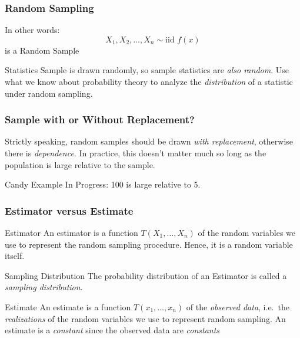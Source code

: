 \documentclass[handout]{beamer}
\begin{document}
\begin{frame}
\frametitle{Random Sampling}
In other words:
	$$X_1, X_2, \hdots, X_n \sim \mbox{iid } f(x)$$
is a \alert{Random Sample}

	\vspace{1em}
\begin{block}{Statistics}
Sample is drawn randomly, so sample statistics are \emph{also random}. Use what we know about probability theory to analyze the \emph{distribution} of a statistic under random sampling.
\end{block}
\end{frame}

\begin{frame}
\frametitle{Sample with or Without Replacement?}
\pause
Strictly speaking, random samples should be drawn \emph{with replacement}, otherwise there is \emph{dependence}. In practice, this doesn't matter much so long as the population is large relative to the sample. 

\vspace{1em}

\alert{Candy Example In Progress: 100 is large relative to 5.}
\end{frame}


\begin{frame}
\frametitle{Estimator versus Estimate}

\begin{block}{Estimator}
An estimator is a function $T(X_1, \hdots, X_n)$ of the random variables we use to represent the random sampling procedure. Hence, it is a random variable itself.
\end{block}
\pause
\begin{block}{Sampling Distribution}
The probability distribution of an Estimator is called a \emph{sampling distribution}.
\end{block}
\pause
\begin{block}{Estimate}
An estimate is a function $T(x_1, \hdots, x_n)$ of the \emph{observed data}, i.e.\ the \emph{realizations} of the random variables we use to represent random sampling. An estimate is a \emph{constant} since the observed data are \emph{constants}
\end{block}

\end{frame}

\end{document}
